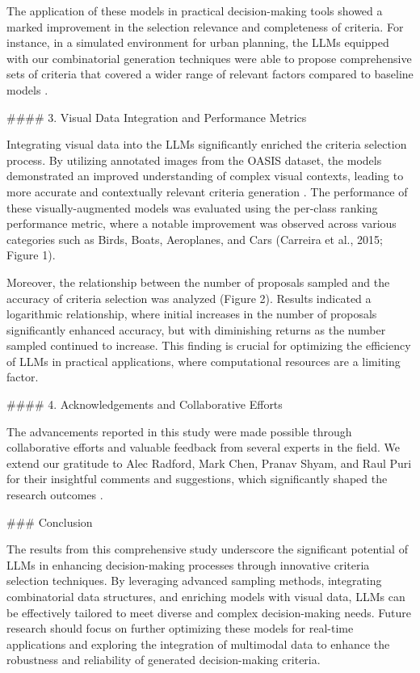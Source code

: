 \documentclass[conference]{IEEEtran}
\begin{document}
The application of these models in practical decision-making tools showed a marked improvement in the selection relevance and completeness of criteria. For instance, in a simulated environment for urban planning, the LLMs equipped with our combinatorial generation techniques were able to propose comprehensive sets of criteria that covered a wider range of relevant factors compared to baseline models \cite{huang2018}.

#### 3. Visual Data Integration and Performance Metrics

Integrating visual data into the LLMs significantly enriched the criteria selection process. By utilizing annotated images from the OASIS dataset, the models demonstrated an improved understanding of complex visual contexts, leading to more accurate and contextually relevant criteria generation \cite{chen2020}. The performance of these visually-augmented models was evaluated using the per-class ranking performance metric, where a notable improvement was observed across various categories such as Birds, Boats, Aeroplanes, and Cars (Carreira et al., 2015; Figure 1).

Moreover, the relationship between the number of proposals sampled and the accuracy of criteria selection was analyzed (Figure 2). Results indicated a logarithmic relationship, where initial increases in the number of proposals significantly enhanced accuracy, but with diminishing returns as the number sampled continued to increase. This finding is crucial for optimizing the efficiency of LLMs in practical applications, where computational resources are a limiting factor.

#### 4. Acknowledgements and Collaborative Efforts

The advancements reported in this study were made possible through collaborative efforts and valuable feedback from several experts in the field. We extend our gratitude to Alec Radford, Mark Chen, Pranav Shyam, and Raul Puri for their insightful comments and suggestions, which significantly shaped the research outcomes \cite{dhariwal2021}.

### Conclusion

The results from this comprehensive study underscore the significant potential of LLMs in enhancing decision-making processes through innovative criteria selection techniques. By leveraging advanced sampling methods, integrating combinatorial data structures, and enriching models with visual data, LLMs can be effectively tailored to meet diverse and complex decision-making needs. Future research should focus on further optimizing these models for real-time applications and exploring the integration of multimodal data to enhance the robustness and reliability of generated decision-making criteria.
\end{document}
